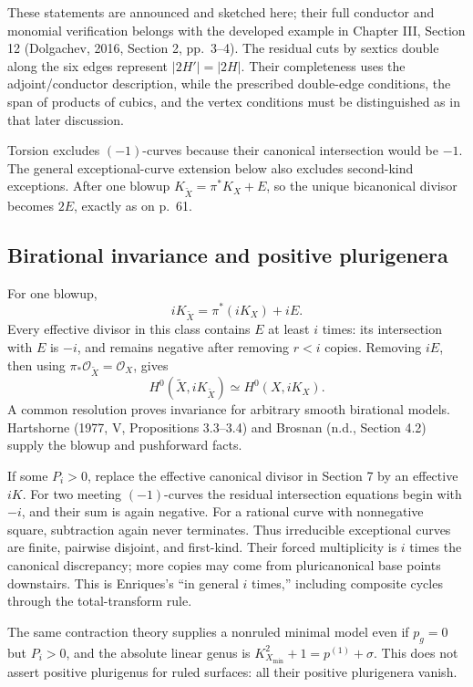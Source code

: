 These statements are announced and sketched here; their full conductor and monomial verification belongs with the developed example in Chapter III, Section 12 (Dolgachev, 2016, Section 2, pp.~3--4). The residual cuts by sextics double along the six edges represent \(|2H'|=|2H|\). Their completeness uses the adjoint/conductor description, while the prescribed double-edge conditions, the span of products of cubics, and the vertex conditions must be distinguished as in that later discussion.

Torsion excludes \((-1)\)-curves because their canonical intersection would be \(-1\). The general exceptional-curve extension below also excludes second-kind exceptions. After one blowup \(K_{\widetilde X}=\pi^*K_X+E\), so the unique bicanonical divisor becomes \(2E\), exactly as on p.~61.

\subsection{Birational invariance and positive plurigenera}

For one blowup, \[
iK_{\widetilde X}=\pi^*(iK_X)+iE.
\] Every effective divisor in this class contains \(E\) at least \(i\) times: its intersection with \(E\) is \(-i\), and remains negative after removing \(r<i\) copies. Removing \(iE\), then using \(\pi_*\mathcal O_{\widetilde X}=\mathcal O_X\), gives \[
H^0(\widetilde X,iK_{\widetilde X})\simeq H^0(X,iK_X).
\] A common resolution proves invariance for arbitrary smooth birational models. Hartshorne (1977, V, Propositions 3.3--3.4) and Brosnan (n.d., Section 4.2) supply the blowup and pushforward facts.

If some \(P_i>0\), replace the effective canonical divisor in Section 7 by an effective \(iK\). For two meeting \((-1)\)-curves the residual intersection equations begin with \(-i\), and their sum is again negative. For a rational curve with nonnegative square, subtraction again never terminates. Thus irreducible exceptional curves are finite, pairwise disjoint, and first-kind. Their forced multiplicity is \(i\) times the canonical discrepancy; more copies may come from pluricanonical base points downstairs. This is Enriques's ``in general \(i\) times,'' including composite cycles through the total-transform rule.

The same contraction theory supplies a nonruled minimal model even if \(p_g=0\) but \(P_i>0\), and the absolute linear genus is \(K_{X_{\min}}^2+1=p^{(1)}+\sigma\). This does not assert positive plurigenus for ruled surfaces: all their positive plurigenera vanish.

